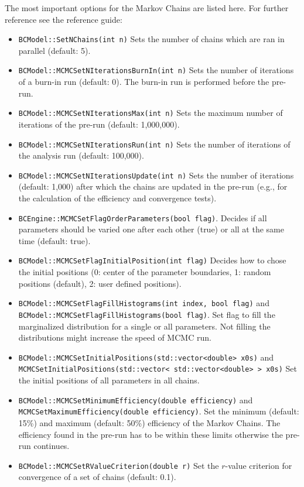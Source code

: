 \documentclass[11pt, a4paper]{article}
\begin{document}
The most important options for the Markov Chains are listed here. For
further reference see the reference guide: 
%
\begin{itemize}
\item \verb|BCModel::SetNChains(int n)| Sets the number of chains
  which are ran in parallel (default: 5).
\item \verb|BCModel::MCMCSetNIterationsBurnIn(int n)| Sets the number
  of iterations of a burn-in run (default: 0). The burn-in run is
  performed before the pre-run.
\item \verb|BCModel::MCMCSetNIterationsMax(int n)| Sets the maximum
  number of iterations of the pre-run (default: 1,000,000).  
\item \verb|BCModel::MCMCSetNIterationsRun(int n)| Sets the number of
  iterations of the analysis run (default: 100,000). 
\item \verb|BCModel::MCMCSetNIterationsUpdate(int n)| Sets the number
  of iterations (default: 1,000) after which the chains are updated in
  the pre-run (e.g., for the calculation of the efficiency and
  convergence tests).
\item \verb|BCEngine::MCMCSetFlagOrderParameters(bool flag)|. Decides
  if all parameters should be varied one after each other (true) or
  all at the same time (default: true). 
\item \verb|BCModel::MCMCSetFlagInitialPosition(int flag)| Decides how
  to chose the initial positions (0: center of the parameter
  boundaries, 1: random positions (default), 2: user defined
  positions).
\item \verb|BCModel::MCMCSetFlagFillHistograms(int index, bool flag)| and \\ 
  \verb|BCModel::MCMCSetFlagFillHistograms(bool flag)|. Set flag to fill the marginalized distribution for a single or all parameters. Not filling the distributions might increase the speed of MCMC run. 
\item \verb|BCModel::MCMCSetInitialPositions(std::vector<double> x0s)|
  and \\ 
  \verb|MCMCSetInitialPositions(std::vector< std::vector<double> > x0s)|
  Set the initial positions of all parameters in all chains.
\item \verb|BCModel::MCMCSetMinimumEfficiency(double efficiency)| and \\ 
  \verb|MCMCSetMaximumEfficiency(double efficiency)|. Set the minimum
  (default: 15\%) and maximum (default: 50\%) efficiency of the Markov
  Chains. The efficiency found in the pre-run has to be within these
  limits otherwise the pre-run continues.
\item \verb|BCModel::MCMCSetRValueCriterion(double r)| Set the
  $r$-value criterion for convergence of a set of chains (default:
  0.1).
\end{itemize}
\end{document}

